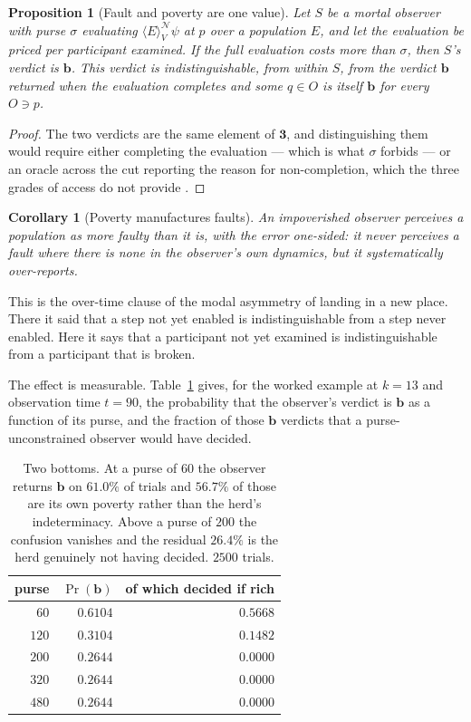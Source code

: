 \documentclass[11pt,a4paper]{article}
\theoremstyle{plain}
\newtheorem{proposition}[theorem]{Proposition}
\newtheorem{corollary}[theorem]{Corollary}
\theoremstyle{definition}
\theoremstyle{remark}
\newcommand{\gE}[2]{\langle E\rangle^{#1}_{#2}}
\newcommand{\Nsp}{\mathcal{N}}
\newcommand{\Val}{V}
\newcommand{\bv}{\mathbf{b}}
\begin{document}
\begin{proposition}[Fault and poverty are one value]\label{prop:twobottoms}
Let $S$ be a mortal observer with purse $\sigma$ evaluating
$\gE{\Nsp}{\Val}\psi$ at $p$ over a population $E$, and let the evaluation be
priced per participant examined. If the full evaluation costs more than
$\sigma$, then $S$'s verdict is $\bv$. This verdict is indistinguishable, from
within $S$, from the verdict $\bv$ returned when the evaluation completes and
some $q \in O$ is itself $\bv$ for every $O \ni p$.
\end{proposition}

\begin{proof}
The two verdicts are the same element of $\mathbf{3}$, and distinguishing them
would require either completing the evaluation --- which is what $\sigma$
forbids --- or an oracle across the cut reporting the reason for
non-completion, which the three grades of access do not provide
\cite[\S2]{scientist}.
\end{proof}

\begin{corollary}[Poverty manufactures faults]
An impoverished observer perceives a population as more faulty than it is, with
the error one-sided: it never perceives a fault where there is none in the
observer's own dynamics, but it systematically over-reports.
\end{corollary}

This is the over-time clause of the modal asymmetry of \cite[Prop.~6]{scientist}
landing in a new place. There it said that a step not yet enabled is
indistinguishable from a step never enabled. Here it says that a participant not
yet examined is indistinguishable from a participant that is broken.

The effect is measurable. Table~\ref{tab:bottom} gives, for the worked example
at $k=13$ and observation time $t=90$, the probability that the observer's
verdict is $\bv$ as a function of its purse, and the fraction of those $\bv$
verdicts that a purse-unconstrained observer would have decided.

\begin{table}[t]
\centering
\begin{tabular}{@{}rrr@{}}
\toprule
purse & $\Pr(\bv)$ & of which decided if rich\\
\midrule
$60$  & $0.6104$ & $0.5668$\\
$120$ & $0.3104$ & $0.1482$\\
$200$ & $0.2644$ & $0.0000$\\
$320$ & $0.2644$ & $0.0000$\\
$480$ & $0.2644$ & $0.0000$\\
\bottomrule
\end{tabular}
\caption{Two bottoms. At a purse of $60$ the observer returns $\bv$ on $61.0\%$
of trials and $56.7\%$ of those are its own poverty rather than the herd's
indeterminacy. Above a purse of $200$ the confusion vanishes and the residual
$26.4\%$ is the herd genuinely not having decided. $2500$ trials.}
\label{tab:bottom}
\end{table}
\end{document}
